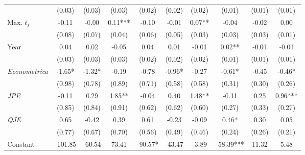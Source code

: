 \begin{landscape}
\begin{table}
\begin{threeparttable}
\begin{tabular}{p{2.5cm}SSSSSSSSS}
                                          &      (0.03)   &      (0.03)   &      (0.03)   &      (0.02)   &      (0.02)   &      (0.02)   &      (0.01)   &      (0.01)   &      (0.01)   \\
            Max. \(t_j\)                  &       -0.11   &       -0.00   &        0.11***&       -0.10   &       -0.01   &        0.07** &       -0.04   &       -0.02   &        0.00   \\
                                          &      (0.08)   &      (0.07)   &      (0.04)   &      (0.06)   &      (0.05)   &      (0.03)   &      (0.03)   &      (0.03)   &      (0.01)   \\
            Year                          &        0.04   &        0.02   &       -0.05   &        0.04   &        0.01   &       -0.01   &        0.02** &       -0.01   &       -0.01   \\
                                          &      (0.03)   &      (0.03)   &      (0.03)   &      (0.02)   &      (0.02)   &      (0.02)   &      (0.01)   &      (0.01)   &      (0.01)   \\
            \textit{Econometrica}         &       -1.65*  &       -1.32*  &       -0.19   &       -0.78   &       -0.96*  &       -0.27   &       -0.61*  &       -0.45   &       -0.46*  \\
                                          &      (0.98)   &      (0.78)   &      (0.89)   &      (0.71)   &      (0.58)   &      (0.58)   &      (0.31)   &      (0.30)   &      (0.26)   \\
            \textit{JPE}                  &       -0.11   &        0.29   &        1.85** &       -0.04   &        0.40   &        1.48** &       -0.11   &        0.25   &        0.96***\\
                                          &      (0.85)   &      (0.84)   &      (0.91)   &      (0.62)   &      (0.62)   &      (0.60)   &      (0.27)   &      (0.33)   &      (0.27)   \\
            \textit{QJE}                  &        0.65   &       -0.42   &        0.39   &        0.61   &       -0.23   &       -0.09   &        0.46*  &        0.30   &        0.05   \\
                                          &      (0.77)   &      (0.67)   &      (0.70)   &      (0.56)   &      (0.49)   &      (0.46)   &      (0.24)   &      (0.26)   &      (0.21)   \\
            Constant                      &     -101.85   &      -60.54   &       73.41   &      -90.57*  &      -43.47   &       -3.89   &      -58.39***&       11.32   &        5.48   \\

\end{tabular}
\end{threeparttable}
\end{table}
\end{landscape}
